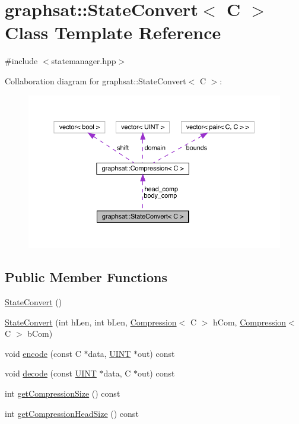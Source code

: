 \hypertarget{classgraphsat_1_1_state_convert}{}\section{graphsat\+::State\+Convert$<$ C $>$ Class Template Reference}
\label{classgraphsat_1_1_state_convert}


{\ttfamily \#include $<$statemanager.\+hpp$>$}



Collaboration diagram for graphsat\+::State\+Convert$<$ C $>$\+:
\nopagebreak
\begin{figure}[H]
\begin{center}
\leavevmode
\includegraphics[width=350pt]{classgraphsat_1_1_state_convert__coll__graph}
\end{center}
\end{figure}
\subsection*{Public Member Functions}
\begin{DoxyCompactItemize}
\item 
\mbox{\hyperlink{classgraphsat_1_1_state_convert_aaa56e67d173c8d73eb4925b20e812d68}{State\+Convert}} ()
\item 
\mbox{\hyperlink{classgraphsat_1_1_state_convert_a1207b78bd7d151c8ce6476d18d535735}{State\+Convert}} (int h\+Len, int b\+Len, \mbox{\hyperlink{classgraphsat_1_1_compression}{Compression}}$<$ C $>$ h\+Com, \mbox{\hyperlink{classgraphsat_1_1_compression}{Compression}}$<$ C $>$ b\+Com)
\item 
void \mbox{\hyperlink{classgraphsat_1_1_state_convert_a81b6e8eaa165d879745c3ccfbe13182a}{encode}} (const C $\ast$data, \mbox{\hyperlink{namespacegraphsat_aa3b3d61a8c27ffc03448c5e1f3a76aed}{U\+I\+NT}} $\ast$out) const
\item 
void \mbox{\hyperlink{classgraphsat_1_1_state_convert_a63207afc56e9b32bba4ee4477802b6c9}{decode}} (const \mbox{\hyperlink{namespacegraphsat_aa3b3d61a8c27ffc03448c5e1f3a76aed}{U\+I\+NT}} $\ast$data, C $\ast$out) const
\item 
int \mbox{\hyperlink{classgraphsat_1_1_state_convert_a6bc26e52e5cc55f29f9d541fe58cd8f9}{get\+Compression\+Size}} () const
\item 
int \mbox{\hyperlink{classgraphsat_1_1_state_convert_a94c8e2ac6473c876b3b4bab2725aab04}{get\+Compression\+Head\+Size}} () const
\end{DoxyCompactItemize}
